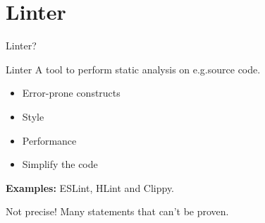 \documentclass[aspectratio=169]{beamer} %
\begin{document}
%     


%     

\section{Linter}
\begin{frame}{Linter?}
  \begin{block}{Linter}
    A tool to perform static analysis on e.g.\@ source code.
    \pause
    \begin{itemize}
      \item Error-prone constructs
      \item Style
      \item Performance
      \item Simplify the code
    \end{itemize}
    \pause
    \textbf{Examples:} ESLint, HLint and Clippy.
  \end{block}

  \pause
  \begin{alertblock}{Not precise!}
    Many statements that can't be proven.
  \end{alertblock}
\end{frame}
\end{document}
